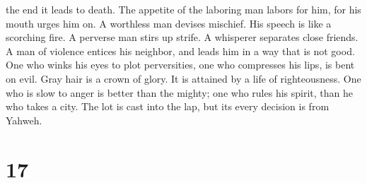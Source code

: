 the end it leads to death.  The appetite of the laboring
man labors for him, for his mouth urges him on.  A
worthless man devises mischief. His speech is like a scorching fire.
 A perverse man stirs up strife. A whisperer separates
close friends.  A man of violence entices his neighbor, and
leads him in a way that is not good.  One who winks his
eyes to plot perversities, one who compresses his lips, is bent on evil.
 Gray hair is a crown of glory. It is attained by a life of
righteousness.  One who is slow to anger is better than the
mighty; one who rules his spirit, than he who takes a city.
 The lot is cast into the lap, but its every decision is
from Yahweh.

\hypertarget{section-16}{%
\section{17}\label{section-16}}

